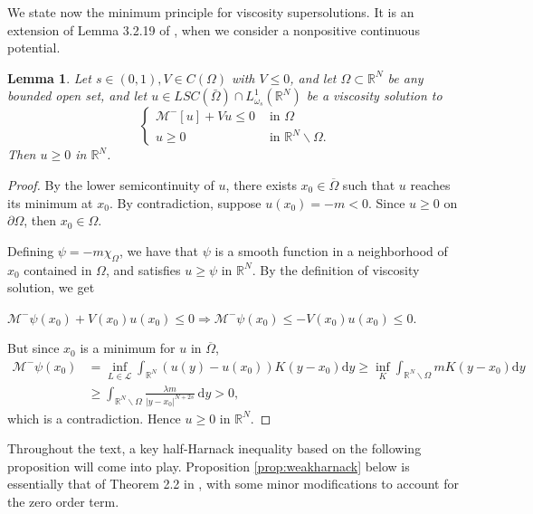 \documentclass[a4paper,11pt]{article}
\newtheorem{lemma}[theorem]{Lemma}
\begin{document}
We state now the minimum principle for viscosity supersolutions. It is an extension of Lemma 3.2.19 of \cite{fernandez-real_integro-differential_2024}, when we consider a nonpositive continuous potential.
\begin{lemma}\label{mP}
Let $s \in(0,1), V\in C(\Omega)$ with $V \leq 0$, and let $\Omega \subset \mathbb{R}^N$ be any bounded open set, and let $u \in L S C(\bar{\Omega}) \cap L_{\omega_s}^1\left(\mathbb{R}^N\right)$ be a viscosity solution to
$$
\begin{cases}\mathcal{M}^{-}[u]+V u \leq 0 & \text { in } \Omega \\ u \geq 0 & \text { in } \mathbb{R}^N \backslash \Omega . \end{cases}
$$
Then $u \geq 0$ in $\mathbb{R}^N$.
\end{lemma}

\begin{proof}
By the lower semicontinuity of $u$, there exists $x_0 \in \overline{\Omega}$ such that $u$ reaches its minimum at $x_0$. By contradiction, suppose $u\left(x_0\right)=-m<0$. Since $u \geq 0$ on $\partial\Omega$, then $x_0 \in \Omega$.
	
Defining $\psi=-m \chi_{\Omega}$, we have that $\psi$ is a smooth function in a neighborhood of $x_0$ contained in $\Omega$, and satisfies $u \geq \psi$ in $\mathbb{R}^N$. By the definition of viscosity solution, we get
\begin{center}
		$
	\mathcal{M}^{-} \psi\left(x_0\right)+V (x_0) u\left(x_0\right) \leq 0 \Longrightarrow \mathcal{M}^{-} \psi\left(x_0\right) \leq-V(x_0) u\left(x_0\right) \leq 0 .
	$
\end{center}
	
	
	But	since $x_0$ is a minimum for $u$ in $\overline\Omega$,
	$$
	\begin{aligned}
	\textstyle	\mathcal{M}^{-} \psi\left(x_0\right) &  	\textstyle = \inf _{L \in \mathcal{L}} \int_{\mathbb{R}^N}\left(u(y)-u\left(x_0\right)\right) K\left(y-x_0\right) \mathrm{d} y 	\textstyle \ge \inf _{K} \int_{\mathbb{R}^N \backslash \Omega} m K\left(y-x_0\right) \mathrm{d} y \\
		& 	\textstyle \geq \int_{\mathbb{R}^N \backslash \Omega} \frac{\lambda m}{\left|y-x_0\right|^{N+2 s}} \mathrm{~d} y  >0,
	\end{aligned}
	$$
which is a contradiction. Hence $u \geq 0$ in $\mathbb{R}^N$.
\end{proof}


Throughout the text, a key half-Harnack inequality based on the following proposition will come into play. Proposition \ref{prop:weakharnack} below is essentially that of Theorem 2.2 in \cite{ros-oton_boundary_2019}, with some minor modifications to account for the zero order term.
\end{document}
